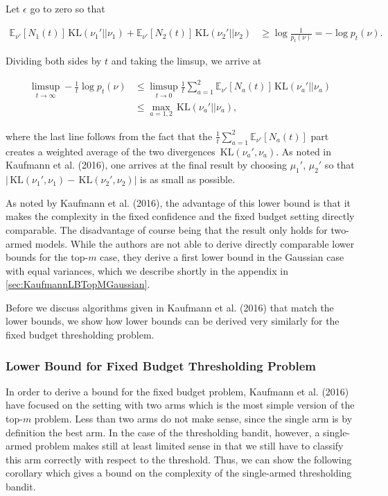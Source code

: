 \documentclass[11pt,]{article}
\newcommand{\KL}{\,\text{KL}}
\begin{document}
Let \(\epsilon\) go to zero so that

\begin{align*}
\mathbb{E}_{\nu'}[N_1(t)]\KL(\nu_1' || \nu_1) + \mathbb{E}_{\nu'}[N_2(t)]\KL(\nu_2' || \nu_2)
& \geq \log \frac{1}{p_t(\nu)} = -\log p_t(\nu).
\end{align*}

Dividing both sides by \(t\) and taking the limsup, we arrive at

\begin{align*}
\limsup_{t \to \infty} - \frac{1}{t} \log p_t(\nu)
& \leq \limsup_{t \to 0} \frac{1}{t} \sum_{a=1}^2 \mathbb{E}_{\nu'}[N_a(t)] \KL(\nu_a' || \nu_a) \\
& \leq \max_{a=1,2} \KL(\nu_a' || \nu_a),
\end{align*}

where the last line follows from the fact that the
\(\frac{1}{t} \sum_{a=1}^2 \mathbb{E}_{\nu'}[N_a(t)]\) part creates a
weighted average of the two divergences \(\KL(\nu_a', \nu_a)\). As noted
in Kaufmann et al. (2016), one arrives at the final result by choosing
\(\mu_1'\), \(\mu_2'\) so that
\(| \KL(\nu_1', \nu_1) - \KL(\nu_2', \nu_2) |\) is as small as possible.

As noted by Kaufmann et al. (2016), the advantage of this lower bound is
that it makes the complexity in the fixed confidence and the fixed
budget setting directly comparable. The disadvantage of course being
that the result only holds for two-armed models. While the authors are
not able to derive directly comparable lower bounds for the top-\(m\)
case, they derive a first lower bound in the Gaussian case with equal
variances, which we describe shortly in the appendix in
\autoref{sec:KaufmannLBTopMGaussian}.

Before we discuss algorithms given in Kaufmann et al. (2016) that match
the lower bounds, we show how lower bounds can be derived very similarly
for the fixed budget thresholding problem.

\subsubsection{\texorpdfstring{Lower Bound for Fixed Budget Thresholding
Problem
\label{sec:LBTBP}}{Lower Bound for Fixed Budget Thresholding Problem }}\label{lower-bound-for-fixed-budget-thresholding-problem}

In order to derive a bound for the fixed budget problem, Kaufmann et al.
(2016) have focused on the setting with two arms which is the most
simple version of the top-\(m\) problem. Less than two arms do not make
sense, since the single arm is by definition the best arm. In the case
of the thresholding bandit, however, a single-armed problem makes still
at least limited sense in that we still have to classify this arm
correctly with respect to the threshold. Thus, we can show the following
corollary which gives a bound on the complexity of the single-armed
thresholding bandit.
\end{document}
